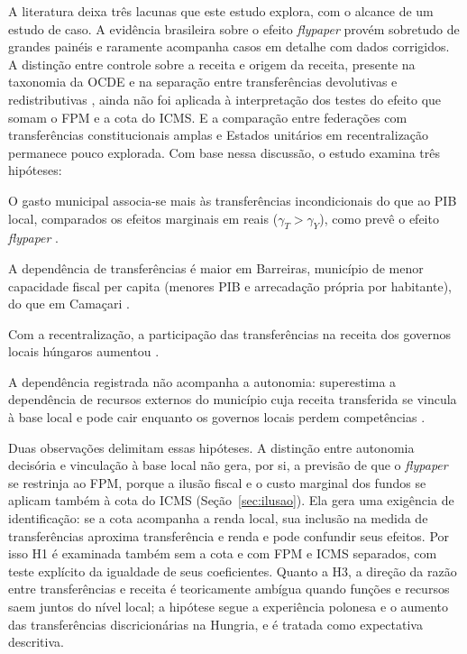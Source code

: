 A literatura deixa três lacunas que este estudo explora, com o alcance de um estudo de caso. A evidência brasileira sobre o efeito \textit{flypaper} provém sobretudo de grandes painéis e raramente acompanha casos em detalhe com dados corrigidos. A distinção entre controle sobre a receita e origem da receita, presente na taxonomia da OCDE \citep{BlochligerKing2006} e na separação entre transferências devolutivas e redistributivas \citep{daCosta2024}, ainda não foi aplicada à interpretação dos testes do efeito que somam o FPM e a cota do ICMS. E a comparação entre federações com transferências constitucionais amplas e Estados unitários em recentralização permanece pouco explorada. Com base nessa discussão, o estudo examina três hipóteses:

\begin{description}[leftmargin=1.2cm,style=nextline]
  \item[H1] O gasto municipal associa-se mais às transferências incondicionais do que ao PIB local, comparados os efeitos marginais em reais ($\gamma_T > \gamma_Y$), como prevê o efeito \textit{flypaper} \citep{HinesThaler1995, Ferreira2019203, Bernardelli2026}.
  \item[H2] A dependência de transferências é maior em Barreiras, município de menor capacidade fiscal per capita (menores PIB e arrecadação própria por habitante), do que em Camaçari \citep{dosSantos2017, Saens2026}.
  \item[H3] Com a recentralização, a participação das transferências na receita dos governos locais húngaros aumentou \citep{Poniatowicz202489, Vasvari2024467}.
  \item[H4] A dependência registrada não acompanha a autonomia: superestima a dependência de recursos externos do município cuja receita transferida se vincula à base local e pode cair enquanto os governos locais perdem competências \citep{BlochligerKing2006, Ladner2016}.
\end{description}

Duas observações delimitam essas hipóteses. A distinção entre autonomia decisória e vinculação à base local não gera, por si, a previsão de que o \textit{flypaper} se restrinja ao FPM, porque a ilusão fiscal e o custo marginal dos fundos se aplicam também à cota do ICMS (Seção~\ref{sec:ilusao}). Ela gera uma exigência de identificação: se a cota acompanha a renda local, sua inclusão na medida de transferências aproxima transferência e renda e pode confundir seus efeitos. Por isso H1 é examinada também sem a cota e com FPM e ICMS separados, com teste explícito da igualdade de seus coeficientes. Quanto a H3, a direção da razão entre transferências e receita é teoricamente ambígua quando funções e recursos saem juntos do nível local; a hipótese segue a experiência polonesa e o aumento das transferências discricionárias na Hungria, e é tratada como expectativa descritiva.
